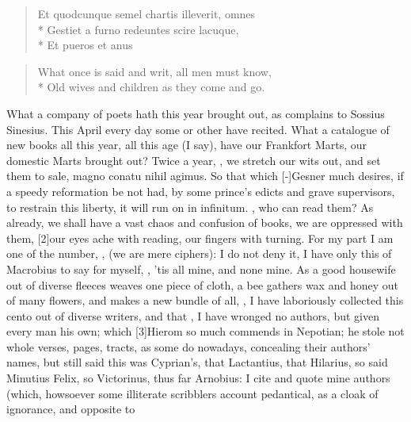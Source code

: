 {\begin{latin}
\begin{verse}
Et quodcunque semel chartis illeverit, omnes\\*
Gestiet a furno redeuntes scire lacuque,\\*
Et pueros et anus
\end{verse}
\end{latin}
\translationrule
\begin{verse}
What once is said and writ, all men must know,\\*
Old wives and children as they come and go.
\end{verse}

What a company of poets hath this year brought out, as \Pliny{} complains
to Sossius Sinesius. This April every day some or other have
recited. What a catalogue of new books all this year, all this age (I
say), have our Frankfort Marts, our domestic Marts brought out? Twice a
year,  , we stretch our wits
out, and set them to sale, magno conatu nihil agimus. So that which
[-\baselineskip]Gesner much desires, if a speedy reformation be not had, by some
prince's edicts and grave supervisors, to restrain this liberty, it
will run on in infinitum. , who can read
them? As already, we shall have a vast chaos and confusion of books, we
are oppressed with them, [2\baselineskip]our eyes ache with reading, our
fingers with turning. For my part I am one of the number, , (we are mere ciphers): I do not deny it, I have only this of
Macrobius to say for myself, , 'tis all mine, and
none mine. As a good housewife out of diverse fleeces weaves one piece
of cloth, a bee gathers wax and honey out of many flowers, and makes a
new bundle of all, , I have
laboriously collected this cento out of diverse writers, and that
, I have wronged no authors, but given every man his own;
which [3\baselineskip]Hierom so much commends in Nepotian; he stole not whole
verses, pages, tracts, as some do nowadays, concealing their authors'
names, but still said this was Cyprian's, that Lactantius, that
Hilarius, so said Minutius Felix, so Victorinus, thus far Arnobius: I
cite and quote mine authors (which, howsoever some illiterate
scribblers account pedantical, as a cloak of ignorance, and opposite to
}

